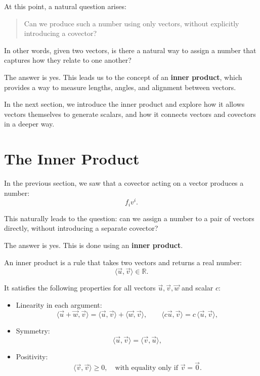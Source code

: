 \documentclass[11pt,openany]{book}
\theoremstyle{definition}
\begin{document}
\medskip

At this point, a natural question arises:

\begin{quote}
Can we produce such a number using only vectors, without explicitly introducing a covector?
\end{quote}

\medskip

In other words, given two vectors, is there a natural way to assign a number that 
captures how they relate to one another?

\medskip

The answer is yes. This leads us to the concept of an \textbf{inner product}, which 
provides a way to measure lengths, angles, and alignment between vectors.

\medskip

In the next section, we introduce the inner product and explore how it allows 
vectors themselves to generate scalars, and how it connects vectors and covectors 
in a deeper way.

\chapter{The Inner Product}

In the previous section, we saw that a covector acting on a vector produces a number:
\[
f_i v^i.
\]

This naturally leads to the question: can we assign a number to a pair of vectors 
directly, without introducing a separate covector?

\medskip

The answer is yes. This is done using an \textbf{inner product}.

\medskip

An inner product is a rule that takes two vectors and returns a real number:
\[
\langle \vec{u}, \vec{v} \rangle \in \mathbb{R}.
\]

\medskip

It satisfies the following properties for all vectors $\vec{u}, \vec{v}, \vec{w}$ 
and scalar $c$:
\begin{itemize}
  \item Linearity in each argument:
  \[
  \langle \vec{u} + \vec{w}, \vec{v} \rangle = \langle \vec{u}, \vec{v} \rangle + \langle \vec{w}, \vec{v} \rangle,
  \qquad
  \langle c\vec{u}, \vec{v} \rangle = c\,\langle \vec{u}, \vec{v} \rangle,
  \]
  \item Symmetry:
  \[
  \langle \vec{u}, \vec{v} \rangle = \langle \vec{v}, \vec{u} \rangle,
  \]
  \item Positivity:
  \[
  \langle \vec{v}, \vec{v} \rangle \geq 0,
  \quad \text{with equality only if } \vec{v} = \vec{0}.
  \]
\end{itemize}
\end{document}
